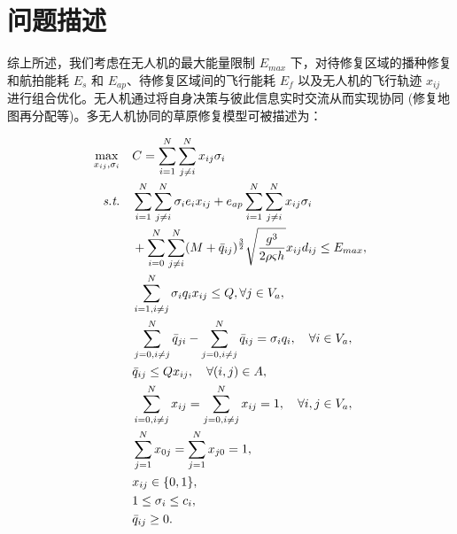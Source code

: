 \documentclass[AutoFakeBold]{LZUThesis}
\begin{document}
\section{问题描述}

综上所述，我们考虑在无人机的最大能量限制 $E_{max}$ 下，对待修复区域的播种修复和航拍能耗 $E_s$ 和 $E_{ap}$、待修复区域间的飞行能耗 $E_f$ 以及无人机的飞行轨迹 $x_{ij}$ 进行组合优化。无人机通过将自身决策与彼此信息实时交流从而实现协同 (修复地图再分配等)。多无人机协同的草原修复模型可被描述为：

\begin{subequations}\label{GRP}
	\begin{align}
		\max_{x_{ij},\sigma_i} \quad & C = \sum^N_{i = 1}\sum^N_{j \neq i} x_{ij}\sigma_i                                                                                                          \\
		\emph{s.t.} \quad            & \sum^N_{i = 1}\sum^N_{j \neq i}\sigma_i e_i x_{ij} + e_{ap}\sum^N_{i=1}\sum^N_{j \neq i} x_{ij}\sigma_i \nonumber                                           \\
									 & + \sum^N_{i=0}\sum^N_{j \neq i} (M + \bar{q}_{ij})^{\frac{3}{2}}\sqrt{\frac{g^3}{2 \rho \varsigma h}} x_{ij} d_{ij} \leq E_{max}, \label{energy-constraint} \\
									 & \sum^N_{i=1, i\neq j} \sigma_i q_i x_{ij} \leq Q, \forall j \in V_a,\label{total-load}                                                                      \\
									 & \sum^N_{j=0, i\neq j}\bar{q}_{ji} -  \sum^N_{j=0, i\neq j}\bar{q}_{ij} = \sigma_i q_i, \label{carry-load} \quad \forall i \in V_a,                          \\
									 & \bar{q}_{ij} \leq Q x_{ij}, \quad \forall (i,j) \in A, \label{load}                                                                                         \\
									 & \sum^N_{i=0, i\neq j} x_{ij} = \sum^N_{j=0,i\neq j} x_{ij} = 1, \quad \forall i,j \in V_a, \label{enter-point}                                              \\
									 & \sum^N_{j=1} x_{0j} = \sum^N_{j=1} x_{j0} = 1, \label{start-point}                                                                                          \\
									 & x_{ij} \in \{0,1\}, \label{binary-variable}                                                                                                                 \\
									 & 1 \leq \sigma_i \leq c_i, \label{area-constraint}                                                                                                           \\
									 & \bar{q}_{ij} \geq 0. \label{flight-weight}
	\end{align}
\end{subequations}
\end{document}
